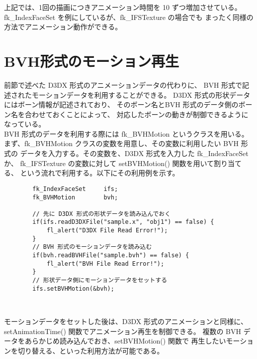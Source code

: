 上記では、1回の描画につきアニメーション時間を 10 ずつ増加させている。
fk\_IndexFaceSet を例にしているが、fk\_IFSTexture の場合でも
まったく同様の方法でアニメーション動作ができる。

\section{BVH形式のモーション再生} \label{sec:bvhmotion}
前節で述べた D3DX 形式のアニメーションデータの代わりに、
BVH 形式で記述されたモーションデータを利用することができる。
D3DX 形式の形状データにはボーン情報が記述されており、
そのボーン名とBVH 形式のデータ側のボーン名を合わせておくことによって、
対応したボーンの動きが制御できるようになっている。
\\
BVH 形式のデータを利用する際には fk\_BVHMotion というクラスを用いる。
まず、fk\_BVHMotion クラスの変数を用意し、その変数に利用したい BVH 形式の
データを入力する。その変数を、D3DX 形式を入力した fk\_IndexFaceSet か、
fk\_IFSTexture の変数に対して setBVHMotion() 関数を用いて割り当てる、
という流れで利用する。以下にその利用例を示す。
\\
\begin{breakbox}
\begin{verbatim}
        fk_IndexFaceSet     ifs;
        fk_BVHMotion        bvh;
        
        // 先に D3DX 形式の形状データを読み込んでおく
        if(ifs.readD3DXFile("sample.x", "obj1") == false) {
            fl_alert("D3DX File Read Error!");
        }
        // BVH 形式のモーションデータを読み込む
        if(bvh.readBVHFile("sample.bvh") == false) {
            fl_alert("BVH File Read Error!");
        }
        // 形状データ側にモーションデータをセットする
        ifs.setBVHMotion(&bvh);
\end{verbatim}
\end{breakbox} ~

モーションデータをセットした後は、D3DX 形式のアニメーションと同様に、
setAnimationTime() 関数でアニメーション再生を制御できる。
複数の BVH データをあらかじめ読み込んでおき、setBVHMotion() 関数で
再生したいモーションを切り替える、といった利用方法が可能である。
